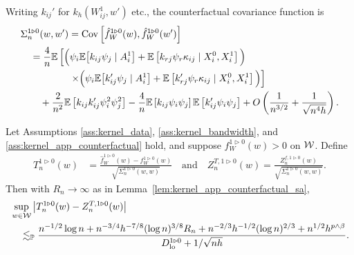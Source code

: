 \begin{lemma}
  \label{lem:kernel_app_counterfactual_covariance_structure}

  Writing $k_{i j}'$ for $k_h(W_{i j}^1, w')$ etc.,
  the counterfactual covariance function is
  \begin{align*}
    &\Sigma_n^{1 \triangleright 0}(w,w')
    = \operatorname{Cov}\left[
      \hat f_W^{1 \triangleright 0}(w),
      \hat f_W^{1 \triangleright 0}(w')
    \right] \\
    &\quad=
    \frac{4}{n}
    \mathbb{E}\left[
      \Big(
        \psi_i
        \mathbb{E}\big[
          k_{i j} \psi_j
          \mid A_i^1
        \big]
        + \mathbb{E}\left[
          k_{r j} \psi_r
          \kappa_{i j}
          \mid X_i^0, X_i^1
        \right]
      \Big)
      \right. \\
      &\left.
      \qquad\qquad\quad
      \times
      \Big(
        \psi_i
        \mathbb{E}\big[
          k_{i j}' \psi_j
          \mid A_i^1
        \big]
        + \mathbb{E}\left[
          k_{r j}' \psi_r \kappa_{i j}
          \mid X_i^0, X_i^1
        \right]
      \Big)
    \right] \\
    &\qquad+
    \frac{2}{n^2}
    \mathbb{E}\left[
      k_{i j} k_{i j}'
      \psi_i^2 \psi_j^2
    \right]
    - \frac{4}{n}
    \mathbb{E}\left[
      k_{i j} \psi_i \psi_j
    \right]
    \mathbb{E}\left[
      k_{i j}' \psi_i \psi_j
    \right]
    + O\left( \frac{1}{n^{3/2}} + \frac{1}{\sqrt{n^4h}} \right).
  \end{align*}

\end{lemma}

\begin{lemma}
  \label{lem:kernel_app_counterfactual_infeasible_t_statistic}

  Let Assumptions \ref{ass:kernel_data},
  \ref{ass:kernel_bandwidth}, and
  \ref{ass:kernel_app_counterfactual}
  hold, and suppose
  $f_W^{1 \triangleright 0}(w) > 0$ on $\mathcal{W}$.
  Define
  \begin{align*}
    T_n^{1 \triangleright 0}(w)
    &= \frac{\hat f_W^{1 \triangleright 0}(w)
    - f_W^{1 \triangleright 0}(w)}
    {\sqrt{\Sigma_n^{1 \triangleright 0}(w,w)}}
    \quad\text{and}\quad
    Z_n^{T, 1 \triangleright 0}(w)
    = \frac{Z_n^{f, 1 \triangleright 0}(w)}
    {\sqrt{\Sigma_n^{1 \triangleright 0}(w,w)}}.
  \end{align*}
  Then with $R_n \to \infty$ as in Lemma~\ref{lem:kernel_app_counterfactual_sa},
  \begin{align*}
    &\sup_{w \in \mathcal{W}}
    \left|
    T_n^{1 \triangleright 0}(w) - Z_n^{T, 1 \triangleright 0}(w)
    \right| \\
    &\quad\lesssim_{\mathbb{P}}
    \frac{
      n^{-1/2} \log n
      + n^{-3/4} h^{-7/8} (\log n)^{3/8} R_n
      + n^{-2/3} h^{-1/2} (\log n)^{2/3}
    + n^{1/2} h^{p \wedge \beta}}
    {D_{\textup{lo}}^{1 \triangleright 0} + 1/\sqrt{n h}}.
  \end{align*}

\end{lemma}

